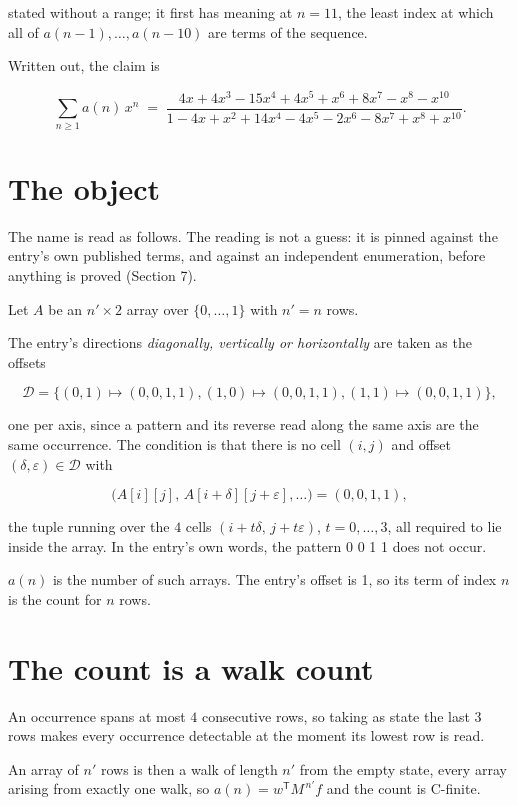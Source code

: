 \documentclass[11pt]{article}
\theoremstyle{definition}
\begin{document}
stated without a range; it first has meaning at $n = 11$, the least index at which all of $a(n-1),\dots,a(n-10)$ are terms of the sequence.

Written out, the claim is

\[\sum_{n \ge 1} a(n)\,x^n \;=\; \frac{4x + 4x^{3} - 15x^{4} + 4x^{5} + x^{6} + 8x^{7} - x^{8} - x^{10}}{1 - 4x + x^{2} + 14x^{4} - 4x^{5} - 2x^{6} - 8x^{7} + x^{8} + x^{10}}.\]

\section{The object}

The name is read as follows. The reading is not a guess: it is pinned against the entry's own published terms, and against an independent enumeration, before anything is proved (Section 7).

Let $A$ be an $n' \times 2$ array over $\{0,\dots,1\}$ with $n' = n$ rows.

The entry's directions {\itshape diagonally, vertically or horizontally} are taken as the offsets

\[\mathcal{D} = \{(0,1)\mapsto(0,0,1,1), (1,0)\mapsto(0,0,1,1), (1,1)\mapsto(0,0,1,1)\},\]

one per axis, since a pattern and its reverse read along the same axis are the same occurrence. The condition is that there is no cell $(i,j)$ and offset $(\delta,\varepsilon)\in\mathcal{D}$ with

\[\bigl(A[i][j],\,A[i{+}\delta][j{+}\varepsilon],\dots\bigr) = (0, 0, 1, 1),\]

the tuple running over the $4$ cells $(i+t\delta,\,j+t\varepsilon)$, $t = 0,\dots,3$, all required to lie inside the array. In the entry's own words, the pattern 0 0 1 1 does not occur.

$a(n)$ is the number of such arrays. The entry's offset is 1, so its term of index $n$ is the count for $n$ rows.

\section{The count is a walk count}

An occurrence spans at most $4$ consecutive rows, so taking as state the last $3$ rows makes every occurrence detectable at the moment its lowest row is read.

An array of $n'$ rows is then a walk of length $n'$ from the empty state, every array arising from exactly one walk, so $a(n) = w^{\mathsf T}M^{\,n'}f$ and the count is C-finite.
\end{document}
